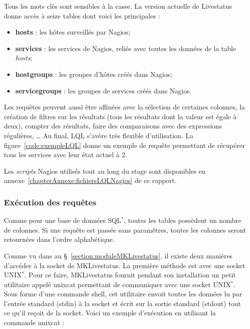 Tous les mots cl\'es sont sensibles \`a la casse. 
La version actuelle de Livestatus donne acc\`es \`a seize tables dont voici les principales :

\begin{itemize}
	\item \textbf{hosts} : les h\^otes surveill\'es par Nagios;
	\item \textbf{services} : les services de Nagios, reli\'es avec toutes les donn\'ees de la table \textit{hosts};
	\item \textbf{hostgroups} : les groupes d'h\^otes cr\'e\'es dans Nagios;
	\item \textbf{servicegroups} : les groupes de services cr\'e\'es dans Nagios.

\end{itemize}

\vspace{0.20cm}

Les requ\^etes peuvent aussi \^etre affin\'ees avec la s\'election de certaines colonnes, la cr\'eation de filtres sur les r\'esultats (tous les r\'esultats dont la valeur est \'egale \`a deux), compter des r\'esultats, faire des comparaisons avec des expressions r\'eguli\`eres, \ldots{}
Au final, LQL s'av\`ere tr\`es flexible d'utilisation.
La figure~\ref{code:exempleLQL} donne un exemple de requ\^ete permettant de r\'ecup\'erer tous les services avec leur \'etat actuel \`a 2.

\vspace{0.20cm}


\label{code:exempleLQL}

Les \textit{scripts} Nagios utilis\'es tout au long du stage sont disponibles en annexe~\ref{chapterAnnexe:fichiersLQLNagios} de ce rapport.

\subsubsection{Ex\'ecution des requ\^etes}

Comme pour une base de donn\'ees SQL$^*$, toutes les tables poss\`edent un nombre de colonnes.
Si une requ\^ete est pass\'ee sans param\^etres, toutes les colonnes seront retourn\'ees dans l'ordre alphab\'etique.

Comme vu dans au \S~\ref{section:moduleMKLivestatus}, il existe deux mani\`eres d'acc\'eder \`a la socket de MKLivestatus.
La premi\`ere m\'ethode est avec une socket UNIX$^*$. 
Pour ce faire, MKLivestatus fournit pendant son installation un petit utilitaire appel\'e \textsf{unixcat} permettant de communiquer avec une socket UNIX$^*$.
Sous forme d'une commande shell, cet utilitaire envoit toutes les donn\'ees lu par l'entr\'ee standard (stdin) \`a la socket et \'ecrit sur la sortie standard (stdout) tout ce qu'il re\c{c}oit de la socket.
Voici un exemple d'ex\'ecution en utilisant la commande \textsf{unixcat} : 

